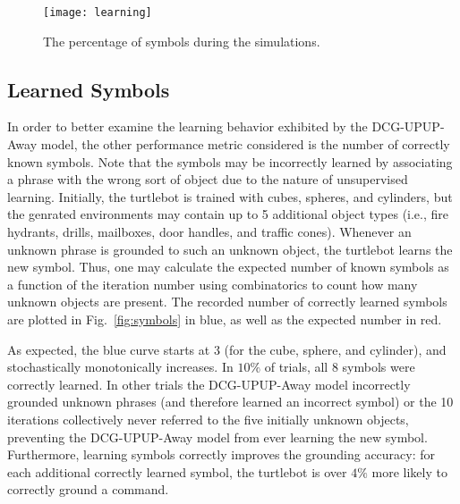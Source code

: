 \begin{figure}[h]
\centering
\texttt{[image: learning]}
\caption{The percentage of symbols during the simulations.}
\label{fig:g_acc_split}
\end{figure}




\subsection{Learned Symbols}
In order to better examine the learning behavior exhibited by the DCG-UPUP-Away model, the other performance metric considered is the number of correctly known symbols. Note that the symbols may be incorrectly learned by associating a phrase with the wrong sort of object due to the nature of unsupervised learning.
Initially, the turtlebot is trained with cubes, spheres, and cylinders, but the genrated environments may contain up to 5 additional object types (i.e., fire hydrants, drills, mailboxes, door handles, and traffic cones).
Whenever an unknown phrase is grounded to such an unknown object, the turtlebot learns the new symbol.
Thus, one may calculate the expected number of known symbols as a function of the iteration number using combinatorics to count how many unknown objects are present.
The recorded number of correctly learned symbols are plotted in Fig.~\ref{fig:symbols} in blue, as well as the expected number in red.

As expected, the blue curve starts at $3$ (for the cube, sphere, and cylinder), and stochastically monotonically increases.
In $10\%$ of trials, all $8$ symbols were correctly learned. In other trials the DCG-UPUP-Away model incorrectly grounded unknown phrases (and therefore learned an incorrect symbol) or the 10 iterations collectively never referred to the five initially unknown objects, preventing the DCG-UPUP-Away model from ever learning the new symbol.
Furthermore, learning symbols correctly improves the grounding accuracy: for each additional correctly learned symbol, the turtlebot is over $4\%$ more likely to correctly ground a command. %

